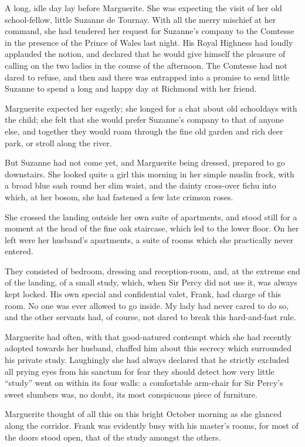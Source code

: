 \documentclass[paper=a5,BCOR=7mm,twoside,DIV=calc,12pt,usegeometry,chapterprefix,endperiod,headings=big]{scrbook}
\begin{document}
A long, idle day lay before Marguerite. She was expecting the visit of her old school-fellow, little Suzanne de Tournay. With all the merry mischief at her command, she had tendered her request for Suzanne's company to the Comtesse in the presence of the Prince of Wales last night. His Royal Highness had loudly applauded the notion, and declared that he would give himself the pleasure of calling on the two ladies in the course of the afternoon. The Comtesse had not dared to refuse, and then and there was entrapped into a promise to send little Suzanne to spend a long and happy day at Richmond with her friend.

Marguerite expected her eagerly; she longed for a chat about old schooldays with the child; she felt that she would prefer Suzanne's company to that of anyone else, and together they would roam through the fine old garden and rich deer park, or stroll along the river.

But Suzanne had not come yet, and Marguerite being dressed, prepared to go downstairs. She looked quite a girl this morning in her simple muslin frock, with a broad blue sash round her slim waist, and the dainty cross-over fichu into which, at her bosom, she had fastened a few late crimson roses.

She crossed the landing outside her own suite of apartments, and stood still for a moment at the head of the fine oak staircase, which led to the lower floor. On her left were her husband's apartments, a suite of rooms which she practically never entered.

They consisted of bedroom, dressing and reception-room, and, at the extreme end of the landing, of a small study, which, when Sir Percy did not use it, was always kept locked. His own special and confidential valet, Frank, had charge of this room. No one was ever allowed to go inside. My lady had never cared to do so, and the other servants had, of course, not dared to break this hard-and-fast rule.

Marguerite had often, with that good-natured contempt which she had recently adopted towards her husband, chaffed him about this secrecy which surrounded his private study. Laughingly she had always declared that he strictly excluded all prying eyes from his sanctum for fear they should detect how very little \enquote{study} went on within its four walls: a comfortable arm-chair for Sir Percy's sweet slumbers was, no doubt, its most conspicuous piece of furniture.

Marguerite thought of all this on this bright October morning as she glanced along the corridor. Frank was evidently busy with his master's rooms, for most of the doors stood open, that of the study amongst the others.
\end{document}
